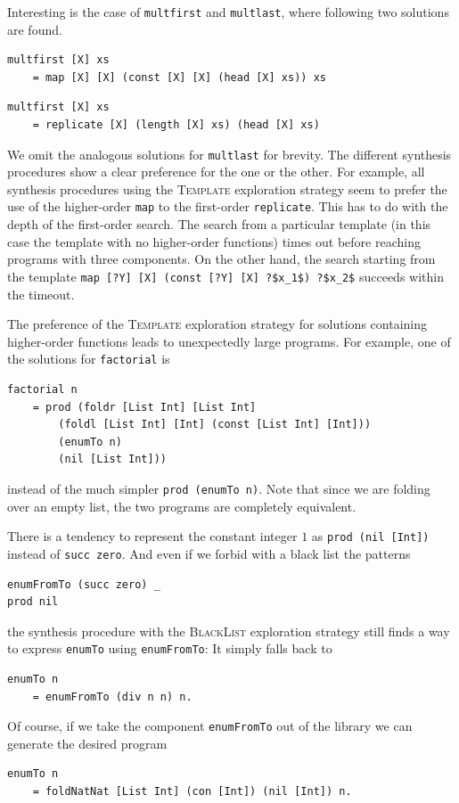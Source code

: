 Interesting is the case of \lstinline?multfirst? and \lstinline?multlast?, where following two solutions are found.
\begin{lstlisting}
multfirst [X] xs
    = map [X] [X] (const [X] [X] (head [X] xs)) xs
\end{lstlisting}
\begin{lstlisting}
multfirst [X] xs
    = replicate [X] (length [X] xs) (head [X] xs)
\end{lstlisting}
We omit the analogous solutions for \lstinline!multlast! for brevity.
The different synthesis procedures show a clear preference for the one or the other. For example, all synthesis procedures using the \textsc{Template} exploration strategy seem to prefer the use of the higher-order \lstinline?map? to the first-order \lstinline?replicate?. This has to do with the depth of the first-order search. The search from a particular template (in this case the template with no higher-order functions) times out before reaching programs with three components. On the other hand, the search starting from the template \lstinline!map [?Y] [X] (const [?Y] [X] ?$x_1$) ?$x_2$! succeeds within the timeout.

The preference of the \textsc{Template} exploration strategy for solutions containing higher-order functions leads to unexpectedly large programs. For example, one of the solutions for \lstinline?factorial? is
\begin{lstlisting}
factorial n
    = prod (foldr [List Int] [List Int]
        (foldl [List Int] [Int] (const [List Int] [Int]))
        (enumTo n)
        (nil [List Int]))
\end{lstlisting}
instead of the much simpler \lstinline?prod (enumTo n)?. Note that since we are folding over an empty list, the two programs are completely equivalent.

There is a tendency to represent the constant integer $1$ as \lstinline?prod (nil [Int])? instead of \lstinline?succ zero?. And even if we forbid with a black list the patterns
\begin{lstlisting}
enumFromTo (succ zero) _
prod nil
\end{lstlisting}
the synthesis procedure with the \textsc{BlackList} exploration strategy still finds a way to express \lstinline?enumTo? using \lstinline?enumFromTo?: It simply falls back to 
\begin{lstlisting}
enumTo n
    = enumFromTo (div n n) n.
\end{lstlisting}
Of course, if we take the component \lstinline?enumFromTo? out of the library we can generate the desired program
\begin{lstlisting}
enumTo n
    = foldNatNat [List Int] (con [Int]) (nil [Int]) n.
\end{lstlisting}

